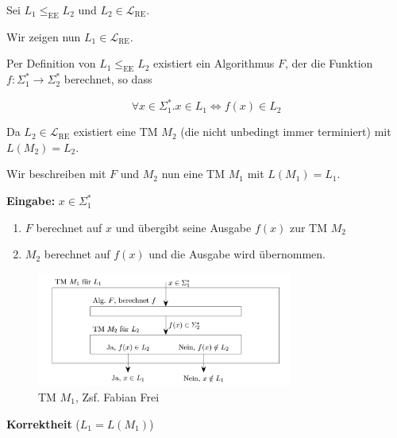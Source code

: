 \documentclass[a4paper, 11pt]{article}
\def\Lre{\mathcal{L}_\text{RE}}
\begin{document}
                            Sei $L_1 \leq_{\text{EE}} L_2$ und $L_2 \in \Lre$.
                        
                            Wir zeigen nun $L_1 \in \Lre$.
                        
                            Per Definition von $L_1 \leq_{\text{EE}} L_2$ existiert ein Algorithmus $F$, 
                            der die Funktion $f:\Sigma_1^* \to \Sigma_2^*$ berechnet, so dass
                        
                            $$\forall x \in \Sigma_1^*. x \in L_1 \iff f(x) \in L_2$$
                        
                            Da $L_2 \in \Lre$ existiert eine TM $M_2$ (die nicht unbedingt immer terminiert) mit $L(M_2) = L_2$.
                        
                            Wir beschreiben mit $F$ und $M_2$ nun eine TM $M_1$ mit $L(M_1) = L_1$.
                            
                            \textbf{Eingabe:} $x \in \Sigma_1^*$
                            \begin{enumerate}[label=\arabic*.]
                                \item $F$ berechnet auf $x$ und übergibt seine Ausgabe $f(x)$ zur TM $M_2$
                                \item $M_2$ berechnet auf $f(x)$ und die Ausgabe wird übernommen.
                            \end{enumerate}
                        
                            \begin{figure}[htp]
                                \includegraphics[width = 0.75\textwidth]{Images/RE-Reduzierbarkeit.png}
                                \caption{TM $M_1$, Zsf. Fabian Frei}
                            \end{figure}
                        
                            \textbf{Korrektheit} ($L_1 = L(M_1)$)
                            
\end{document}
